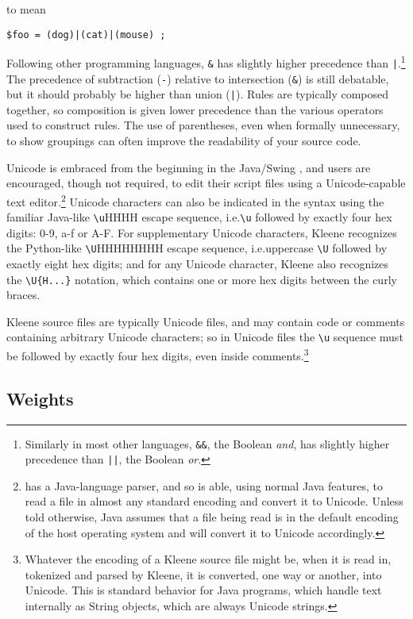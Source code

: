 \noindent
to mean

\begin{Verbatim}
$foo = (dog)|(cat)|(mouse) ;
\end{Verbatim}

\noindent
Following other programming languages, \verb!&! has slightly higher
precedence than \verb!|!.\footnote{Similarly in most other languages,
\texttt{\&\&}, the Boolean \emph{and},
has slightly higher precedence than \texttt{||}, the Boolean \emph{or}.}
The precedence of subtraction (\verb!-!) relative to intersection
(\verb!&!) is still debatable, but it should probably be higher than
union (\verb!|!).
Rules are typically composed together, so composition is given lower precedence
than the various operators used to construct rules.  The use of
parentheses, even when formally unnecessary, to show groupings can
often improve the readability of your source code.

Unicode is embraced from the beginning in the Java/Swing , and users
are encouraged, though not required, to edit
their script files using a Unicode-capable text
editor.\footnote{\Kleene{} has a Java-language
parser, and so is able, using normal Java features, to read a file in
almost any standard encoding and convert it to Unicode.  Unless told otherwise,
Java assumes that a file being read is in the default encoding of the
host
operating system and will convert it to Unicode accordingly.}  Unicode
characters can also
be indicated in the syntax using the familiar Java-like \verb!\u!HHHH
escape sequence, i.e.\@ \verb!\u! followed by exactly four hex
digits: 0-9, a-f or A-F.  For
supplementary Unicode characters, Kleene recognizes the Python-like
\verb!\U!HHHHHHHH escape sequence, i.e.\@ uppercase
\verb!\U! followed by exactly eight hex digits; and for any Unicode
character, Kleene also recognizes the
\verb!\U{H...}! notation, which contains one or more hex digits between the
curly braces.

Kleene source files are typically Unicode files, and may contain code or comments
containing arbitrary Unicode characters; so in Unicode files
the \verb!\u!  sequence must be
followed by exactly four hex digits, even inside comments.\footnote{Whatever
the encoding of a Kleene source file might be, when it is read in, tokenized
and parsed by Kleene, it is converted, one way or another, into Unicode.  This
is standard behavior for Java programs, which handle text internally as
String objects, which are always Unicode strings.}

\subsection{Weights}

